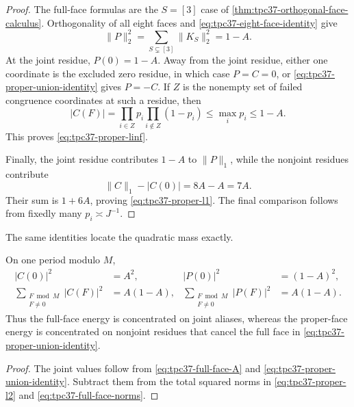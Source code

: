 \begin{proof}
The full-face formulas are the \(S=[3]\) case of
\cref{thm:tpc37-orthogonal-face-calculus}.  Orthogonality of all eight
faces and \eqref{eq:tpc37-eight-face-identity} give
\begin{equation}
 \|P\|_2^2
 =\sum_{S\subsetneq[3]}\|K_S\|_2^2
 =1-A.
 \label{eq:tpc37-proper-l2-proof}
\end{equation}
At the joint residue, \(P(0)=1-A\).  Away from the joint residue, either
one coordinate is the excluded zero residue, in which case \(P=C=0\),
or \eqref{eq:tpc37-proper-union-identity} gives \(P=-C\).  If \(Z\) is
the nonempty set of failed congruence coordinates at such a residue,
then
\begin{equation}
 |C(F)|
 =\prod_{i\in Z}p_i
  \prod_{i\notin Z}(1-p_i)
 \le \max_i p_i
 \le1-A.
 \label{eq:tpc37-proper-pointwise-failed}
\end{equation}
This proves \eqref{eq:tpc37-proper-linf}.

Finally, the joint residue contributes \(1-A\) to \(\|P\|_1\), while
the nonjoint residues contribute
\begin{equation}
 \|C\|_1-|C(0)|=8A-A=7A.
 \label{eq:tpc37-proper-offjoint-l1}
\end{equation}
Their sum is \(1+6A\), proving \eqref{eq:tpc37-proper-l1}.  The final
comparison follows from fixedly many \(p_i\asymp J^{-1}\).
\end{proof}

The same identities locate the quadratic mass exactly.

\begin{corollary}
\label{cor:tpc37-joint-ghost-energy}
On one period modulo \(M\),
\begin{align}
 |C(0)|^2&=A^2,
 &|P(0)|^2&=(1-A)^2,
 \label{eq:tpc37-joint-face-energy}\\
 \sum_{\substack{F\bmod M\\F\ne0}}|C(F)|^2
 &=A(1-A),
 &\sum_{\substack{F\bmod M\\F\ne0}}|P(F)|^2
 &=A(1-A).
 \label{eq:tpc37-ghost-face-energy}
\end{align}
Thus the full-face energy is concentrated on joint aliases, whereas the
proper-face energy is concentrated on nonjoint residues that cancel the
full face in \eqref{eq:tpc37-proper-union-identity}.
\end{corollary}

\begin{proof}
The joint values follow from \eqref{eq:tpc37-full-face-A} and
\eqref{eq:tpc37-proper-union-identity}.  Subtract them from the total
squared norms in \eqref{eq:tpc37-proper-l2} and
\eqref{eq:tpc37-full-face-norms}.
\end{proof}

